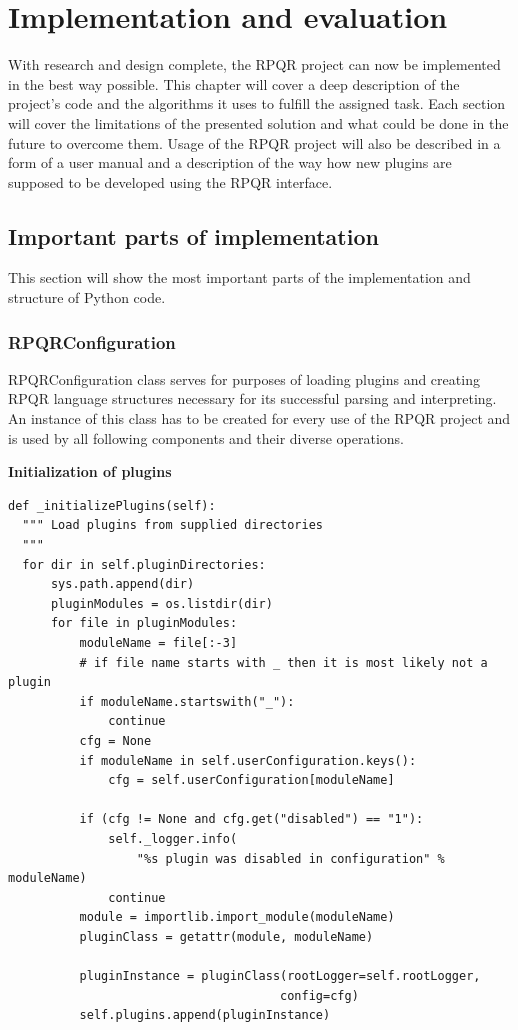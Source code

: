 \chapter{Implementation and evaluation}
With research and design complete, the RPQR project can now be implemented in the best way possible.
This chapter will cover a deep description of the project's code and the algorithms it uses to fulfill the
assigned task. Each section will cover the limitations of the presented solution and what could be done
in the future to overcome them. Usage of the RPQR project will also be described in a form of a user
manual and a description of the way how new plugins are supposed to be developed using the RPQR interface.

\section{Important parts of implementation}
This section will show the most important parts of the implementation and structure of Python code.

\subsection*{RPQRConfiguration}
RPQRConfiguration class serves for purposes of loading plugins and creating RPQR language structures
necessary for its successful parsing and interpreting. An instance of this class has to be created for
every use of the RPQR project and is used by all following components and their diverse operations.

\newpage

\textbf{Initialization of plugins}

\begin{lstlisting}
def _initializePlugins(self):
  """ Load plugins from supplied directories
  """
  for dir in self.pluginDirectories:
      sys.path.append(dir)
      pluginModules = os.listdir(dir)
      for file in pluginModules:
          moduleName = file[:-3]
          # if file name starts with _ then it is most likely not a plugin
          if moduleName.startswith("_"):
              continue
          cfg = None
          if moduleName in self.userConfiguration.keys():
              cfg = self.userConfiguration[moduleName]

          if (cfg != None and cfg.get("disabled") == "1"):
              self._logger.info(
                  "%s plugin was disabled in configuration" % moduleName)
              continue
          module = importlib.import_module(moduleName)
          pluginClass = getattr(module, moduleName)

          pluginInstance = pluginClass(rootLogger=self.rootLogger,
                                      config=cfg)
          self.plugins.append(pluginInstance)
\end{lstlisting}

